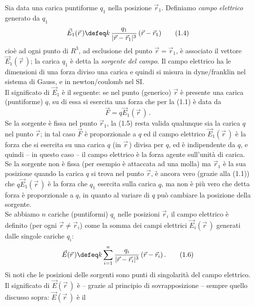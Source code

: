 Sia data una carica puntiforme $q_1$ nella posizione $\vec r_1$. Definiamo
\emph{campo elettrico} generato da $q_1$
\begin{equation}
  \vec E_1(\vec r\,)\defeq k\,\frac{q_1}{|\vec r-\vec r_1|^3}\,(\vec r-\vec r_1)
  \tag{1.4}
\end{equation}
cio\`e ad ogni punto di $R^3$, ad esclusione del punto $\vec r=\vec r_1$, \`e
associato il vettore $\vec E_1(\vec r\,)$; la carica $q_1$ \`e detta la
\emph{sorgente del campo}. Il campo elettrico ha le dimensioni di una forza
diviso una carica e quindi si misura in dyne/franklin nel sistema di Gauss, e in
newton/coulomb nel SI.\\
Il significato di $\vec E_1$ \`e il seguente: se nel punto (generico) $\vec r$
\`e presente una carica (puntiforme) $q$, su di essa si esercita una forza che
per la (1.1) \`e data da
\begin{equation}
  \vec F=q\vec E_1(\vec r\,)\,.
  \tag{1.5}
\end{equation}
Se la sorgente \`e fissa nel punto $\vec r_1$, la (1.5) resta valida qualunque
sia la carica $q$ nel punto $\vec r$; in tal caso $\vec F$ \`e proporzionale a
$q$ ed il campo elettrico $\vec E_1(\vec r\,)$ \`e la forza che si esercita su
una carica $q$ (in $\vec r\,$) divisa per $q$, ed \`e indipendente da $q$, e
quindi -- in questo caso -- il campo elettrico \`e la forza agente sull'unit\`a
di carica. Se la sorgente non \`e fissa (per esempio \`e attaccata ad una molla)
ma $\vec r_1$ \`e la sua posizione quando la carica $q$ si trova nel punto
$\vec r$, \`e ancora vero \big(grazie alla (1.1)\big) che $q\vec E_1(\vec r\,)$
\`e la forza che $q_1$ esercita sulla carica $q$, ma non \`e pi\`u vero che
detta forza \`e proporzionale a $q$, in quanto al variare di $q$ pu\`o cambiare
la posizione della sorgente.\\
Se abbiamo $n$ cariche (puntiformi) $q_i$ nelle posizioni $\vec r_i$ il campo
elettrico \`e definito (per ogni $\vec r\neq\vec r_i$) come la somma dei campi
elettrici $\vec E_i(\vec r\,)$ generati dalle singole cariche $q_i$:
\begin{equation}
  \vec E(\vec r\,)\defeq k\sum_{i=1}^n
  \frac{q_i}{|\vec r-\vec r_i|^3}\,(\vec r-\vec r_i)\,.
  \tag{1.6}
\end{equation}
Si noti che le posizioni delle sorgenti sono punti di singolarit\`a del campo
elettrico.\\
Il significato di $\vec E(\vec r\,)$ \`e -- grazie al principio di
sovrapposizione -- sempre quello discusso sopra: $\vec E(\vec r\,)$ \`e il

